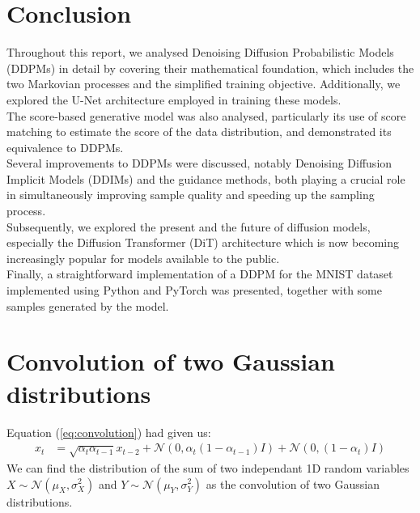 \documentclass{article}
\numberwithin{equation}{section}
\numberwithin{figure}{section}
\begin{document}
\newpage
\section{Conclusion}
Throughout this report, we analysed Denoising Diffusion Probabilistic Models (DDPMs) in detail by covering their mathematical foundation, which includes the two Markovian processes and the simplified training objective. Additionally, we explored the U-Net architecture employed in training these models. \\
The score-based generative model was also analysed, particularly its use of score matching to estimate the score of the data distribution, and demonstrated its equivalence to DDPMs. \\
Several improvements to DDPMs were discussed, notably Denoising Diffusion Implicit Models (DDIMs) and the guidance methods, both playing a crucial role in simultaneously improving sample quality and speeding up the sampling process. \\
Subsequently, we explored the present and the future of diffusion models, especially the Diffusion Transformer (DiT) architecture which is now becoming increasingly popular for models available to the public. \\
Finally, a straightforward implementation of a DDPM for the MNIST dataset implemented using Python and PyTorch was presented, together with some samples generated by the model.

\newpage
\appendix
\section{Convolution of two Gaussian distributions}\label{appendix:a}
Equation (\ref{eq:convolution}) had given us:
\begin{align*}
  x_t &= \sqrt{\alpha_t \alpha_{t-1}} x_{t-2} + \mathcal{N}\left(0, \alpha_t\left(1 - \alpha_{t-1}\right)I \right) + \mathcal{N}\left(0, (1 - \alpha_t) I \right)
\end{align*}
We can find the distribution of the sum of two independant 1D random variables $X \sim \mathcal{N}\left(\mu_X, \sigma_X^2\right)$ and $Y \sim \mathcal{N}\left(\mu_Y, \sigma_Y^2\right)$ as the convolution of two Gaussian distributions.
\end{document}
